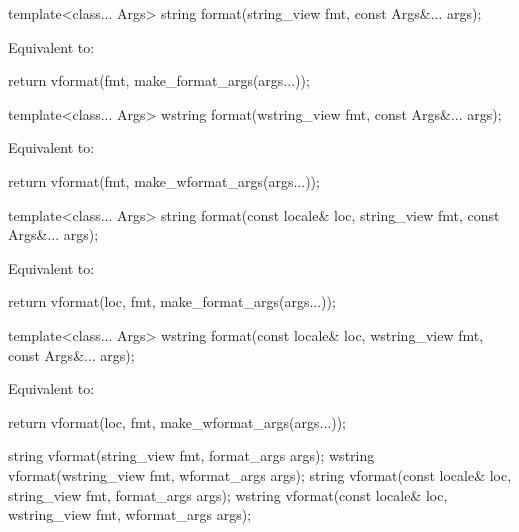 %
\begin{itemdecl}
template<class... Args>
  string format(string_view fmt, const Args&... args);
\end{itemdecl}

\begin{itemdescr}
\pnum
\effects
Equivalent to:
\begin{codeblock}
return vformat(fmt, make_format_args(args...));
\end{codeblock}
\end{itemdescr}

%
\begin{itemdecl}
template<class... Args>
  wstring format(wstring_view fmt, const Args&... args);
\end{itemdecl}

\begin{itemdescr}
\pnum
\effects
Equivalent to:
\begin{codeblock}
return vformat(fmt, make_wformat_args(args...));
\end{codeblock}
\end{itemdescr}

%
\begin{itemdecl}
template<class... Args>
  string format(const locale& loc, string_view fmt, const Args&... args);
\end{itemdecl}

\begin{itemdescr}
\pnum
\effects
Equivalent to:
\begin{codeblock}
return vformat(loc, fmt, make_format_args(args...));
\end{codeblock}
\end{itemdescr}

%
\begin{itemdecl}
template<class... Args>
  wstring format(const locale& loc, wstring_view fmt, const Args&... args);
\end{itemdecl}

\begin{itemdescr}
\pnum
\effects
Equivalent to:
\begin{codeblock}
return vformat(loc, fmt, make_wformat_args(args...));
\end{codeblock}
\end{itemdescr}

%
\begin{itemdecl}
string vformat(string_view fmt, format_args args);
wstring vformat(wstring_view fmt, wformat_args args);
string vformat(const locale& loc, string_view fmt, format_args args);
wstring vformat(const locale& loc, wstring_view fmt, wformat_args args);
\end{itemdecl}

